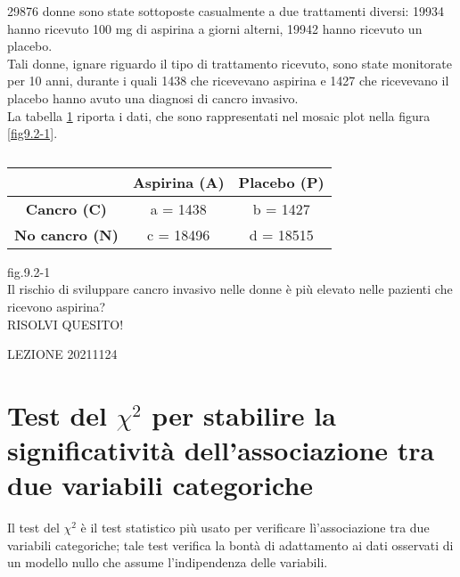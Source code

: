 \documentclass[drafts, 10pt]{book}
\newcounter{example}[section]
\begin{document}
\begin{example}
29876 donne sono state sottoposte casualmente a due trattamenti diversi: 19934 hanno ricevuto 100 mg di aspirina a giorni alterni, 19942 hanno ricevuto un placebo.
\\
Tali donne, ignare riguardo il tipo di trattamento ricevuto, sono state monitorate per 10 anni, durante i quali 1438 che ricevevano aspirina e 1427 che ricevevano il placebo hanno avuto una diagnosi di cancro invasivo.
\\
La tabella \ref{tabaspirina} riporta i dati, che sono rappresentati nel mosaic plot nella figura \ref{fig9.2-1}.
\begin{table}[H]
        \centering
        \renewcommand\arraystretch{1.2}
        \begin{tabular}{c|c|c}
        \hline
         & \textbf{Aspirina (A)} & \textbf{Placebo (P)}\\
        \hline
        \textbf{Cancro (C)} & a = 1438 & b = 1427 \\
        \hline
        \textbf{No cancro (N)} & c = 18496 & d = 18515\\
        \hline
        \end{tabular}
        \caption{}
        \label{tabaspirina}
\end{table}\noindent
    fig.9.2-1 \label{fig9.2-1}%
    \\
    Il rischio di sviluppare cancro invasivo nelle donne è più elevato nelle pazienti che ricevono aspirina?
    \\
    RISOLVI QUESITO!
\end{example}

\begin{example}
LEZIONE 20211124
\end{example}

\section{Test del \texorpdfstring{$\chi^2$}{Lg} per stabilire la significatività dell'associazione tra due variabili categoriche}

Il test del $\chi^2$ è il test statistico più usato per verificare lì'associazione tra due variabili categoriche; tale test verifica la bontà di adattamento ai dati osservati di un modello nullo che assume l'indipendenza delle variabili.
\end{document}
